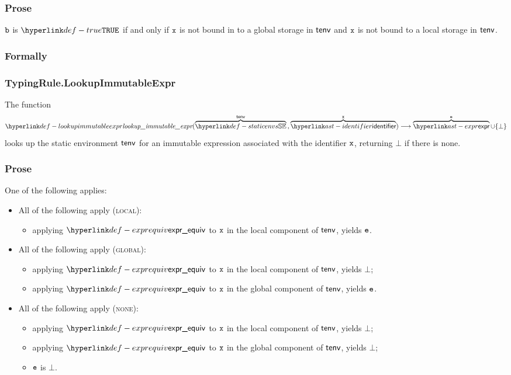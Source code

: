 \subsubsection{Prose}
$\vb$ is $\True$ if and only if $\vx$ is not bound in to a global storage in $\tenv$ and
$\vx$ is not bound to a local storage in $\tenv$.

\subsubsection{Formally}
\begin{mathpar}
\end{mathpar}

\subsubsection{TypingRule.LookupImmutableExpr\label{sec:TypingRule.LookupImmutableExpr}}
\hypertarget{def-lookupimmutableexpr}{}
The function
\[
\lookupimmutableexpr(\overname{\staticenvs}{\tenv} \aslsep \overname{\identifier}{\vx}) \aslto \overname{\expr}{\ve} \cup \{\bot\}
\]
looks up the static environment $\tenv$ for an immutable expression associated with the identifier $\vx$,
returning $\bot$ if there is none.

\subsubsection{Prose}
One of the following applies:
\begin{itemize}
  \item All of the following apply (\textsc{local}):
  \begin{itemize}
    \item applying $\exprequiv$ to $\vx$ in the local component of $\tenv$, yields $\ve$.
  \end{itemize}

  \item All of the following apply (\textsc{global}):
  \begin{itemize}
    \item applying $\exprequiv$ to $\vx$ in the local component of $\tenv$, yields $\bot$;
    \item applying $\exprequiv$ to $\vx$ in the global component of $\tenv$, yields $\ve$.
  \end{itemize}

  \item All of the following apply (\textsc{none}):
  \begin{itemize}
    \item applying $\exprequiv$ to $\vx$ in the local component of $\tenv$, yields $\bot$;
    \item applying $\exprequiv$ to $\vx$ in the global component of $\tenv$, yields $\bot$;
    \item $\ve$ is $\bot$.
  \end{itemize}
\end{itemize}
